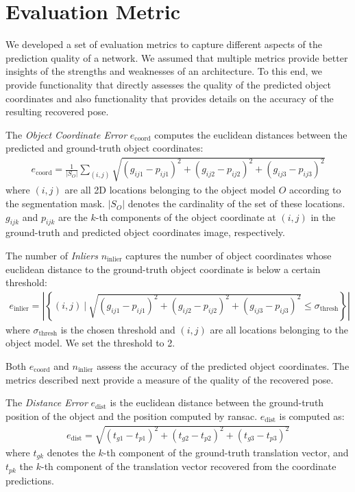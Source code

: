 \section{Evaluation Metric}

We developed a set of evaluation metrics to capture different aspects of the prediction quality of a network. We assumed that multiple metrics provide better insights of the strengths and weaknesses of an architecture. To this end, we provide functionality that directly assesses the quality of the predicted object coordinates and also functionality that provides details on the accuracy of the resulting recovered pose.

The \textit{Object Coordinate Error} $e_{\text{coord}}$ computes the euclidean distances between the predicted and ground-truth object coordinates:
\begin{align*}
e_{\text{coord}} = \frac{1}{|S_O|} \sum\limits_{(i, j)} \sqrt{(g_{ij1} - p_{ij1})^2 +(g_{ij2} - p_{ij2})^2 + (g_{ij3} - p_{ij3})^2}
\end{align*}
where $(i, j)$ are all 2D locations belonging to the object model $O$ according to the segmentation mask. $|S_O|$ denotes the cardinality of the set of these locations. $g_{ijk}$ and $p_{ijk}$ are the $k$-th components of the object coordinate at $(i, j)$ in the ground-truth and predicted object coordinates image, respectively.

The number of \textit{Inliers} $n_{\text{inlier}}$ captures the number of object coordinates whose euclidean distance to the ground-truth object coordinate is below a certain threshold:
\begin{align*}
e_{\text{inlier}} = \left\rvert\left\lbrace(i,j) \ \bigg| \ \sqrt{(g_{ij1} - p_{ij1})^2 +(g_{ij2} - p_{ij2})^2 + (g_{ij3} - p_{ij3})^2} \leq \sigma_{\text{thresh}}\right\rbrace \right\rvert
\end{align*}
where $\sigma_{\text{thresh}}$ is the chosen threshold and $(i,j)$ are all locations belonging to the object model. We set the threshold to 2.

Both $e_{\text{coord}}$ and $n_{\text{inlier}}$ assess the accuracy of the predicted object coordinates. The metrics described next provide a measure of the quality of the recovered pose.

The \textit{Distance Error} $e_{\text{dist}}$ is the euclidean distance between the ground-truth position of the object and the position computed by \ac{ransac}. $e_{\text{dist}}$ is computed as:
\begin{align*}
e_{\text{dist}} = \sqrt{(t_{g1} - t_{p1})^2 +(t_{g2} - t_{p2})^2 + (t_{g3} - t_{p3})^2}
\end{align*}
where $t_{gk}$ denotes the $k$-th component of the ground-truth translation vector, and $t_{pk}$ the $k$-th component of the translation vector recovered from the coordinate predictions.

